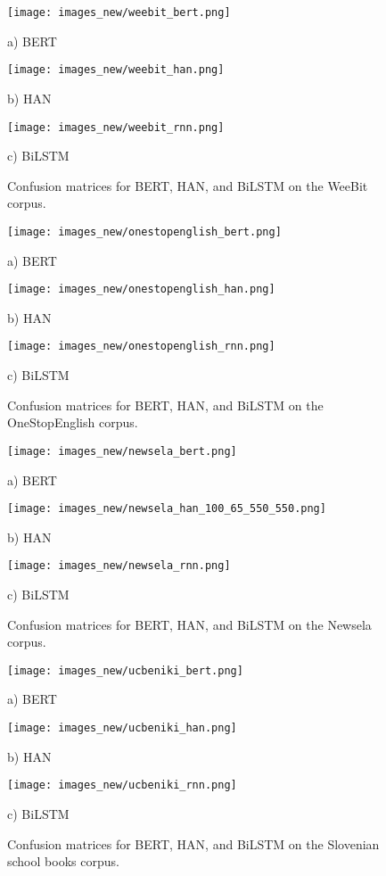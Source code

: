 \documentclass{clv3}
\begin{document}
\begin{figure}[t]
  \texttt{[image: images\_new/weebit\_bert.png]}
  \centerline{a) BERT}
\endminipage\hfill
{}
  \texttt{[image: images\_new/weebit\_han.png]}
    \centerline{b) HAN}
\endminipage\hfill
{}
  \texttt{[image: images\_new/weebit\_rnn.png]}
    \centerline{c) BiLSTM}
\endminipage
 \caption{Confusion matrices for BERT, HAN, and BiLSTM on the WeeBit corpus.} 
   \label{fig:cm_weebit}
\end{figure}


\begin{figure}[t]
  \texttt{[image: images\_new/onestopenglish\_bert.png]}
  \centerline{a) BERT}
\endminipage\hfill
{}
  \texttt{[image: images\_new/onestopenglish\_han.png]}
    \centerline{b) HAN}
\endminipage\hfill
{}
  \texttt{[image: images\_new/onestopenglish\_rnn.png]}
    \centerline{c) BiLSTM}
\endminipage
 \caption{Confusion matrices for BERT, HAN, and BiLSTM on the OneStopEnglish corpus.} 
   \label{fig:cm_onestopenglish}
\end{figure}


\begin{figure}[t]
  \texttt{[image: images\_new/newsela\_bert.png]}
  \centerline{a) BERT}
\endminipage\hfill
{}
  \texttt{[image: images\_new/newsela\_han\_100\_65\_550\_550.png]}
    \centerline{b) HAN}
\endminipage\hfill
{}
  \texttt{[image: images\_new/newsela\_rnn.png]}
    \centerline{c) BiLSTM}
\endminipage
 \caption{Confusion matrices for BERT, HAN, and BiLSTM on the Newsela corpus.} 
  \label{fig:cm_newsela}
\end{figure}

\begin{figure}[t]
  \texttt{[image: images\_new/ucbeniki\_bert.png]}
  \centerline{a) BERT}
\endminipage\hfill
{}
  \texttt{[image: images\_new/ucbeniki\_han.png]}
    \centerline{b) HAN}
\endminipage\hfill
{}
  \texttt{[image: images\_new/ucbeniki\_rnn.png]}
    \centerline{c) BiLSTM}
\endminipage
 \caption{Confusion matrices for BERT, HAN, and BiLSTM on the Slovenian school books corpus.} 
   \label{fig:cm_ucbeniki}
\end{figure}
\end{document}
